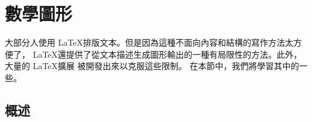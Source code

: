 \setcounter{chapter}{4}
\newcommand{\graphicscompanion}{\emph{The \LaTeX{} Graphics Companion}~\cite{graphicscompanion}}
\newcommand{\hobby}{\emph{A User's Manual for MetaPost}~\cite{metapost}}
\newcommand{\hoenig}{\emph{\TeX{} Unbound}~\cite{unbound}}
\newcommand{\graphicsinlatex}{\emph{Graphics in \LaTeXe{}}~\cite{ursoswald}}

\chapter{數學圖形}
\label{chap:graphics}

\begin{intro}
大部分人使用 \LaTeX 排版文本。但是因為這種不面向內容和結構的寫作方法太方便了，
\LaTeX 還提供了從文本描述生成圖形輸出的一種有局限性的方法。此外，大量的 \LaTeX 擴展
被開發出來以克服這些限制。 在本節中，我們將學習其中的一些。
\end{intro}
\section{概述}


